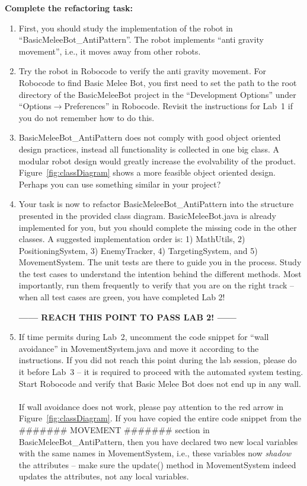 \documentclass{scrreprt}
\begin{document}
\newpage

\textbf{Complete the refactoring task:}
\begin{enumerate}
\item First, you should study the implementation of the robot in ``BasicMeleeBot_AntiPattern''. The robot implements ``anti gravity movement'', i.e., it moves away from other robots. 
\item Try the robot in Robocode to verify the anti gravity movement. For Robocode to find Basic Melee Bot, you first need to set the path to the root directory of the BasicMeleeBot project in the ``Development Options'' under ``Options$\rightarrow$Preferences'' in Robocode. Revisit the instructions for Lab~1 if you do not remember how to do this.
\item BasicMeleeBot_AntiPattern does not comply with good object oriented design practices, instead all functionality is collected in one big class. A modular robot design would greatly increase the evolvability of the product. Figure~\ref{fig:classDiagram} shows a more feasible object oriented design. Perhaps you can use something similar in your project?
\item Your task is now to refactor BasicMeleeBot_AntiPattern into the structure presented in the provided class diagram. BasicMeleeBot.java is already implemented for you, but you should complete the missing code in the other classes. A suggested implementation order is: 1) MathUtils, 2) PositioningSystem, 3) EnemyTracker, 4) TargetingSystem, and 5) MovementSystem. The unit tests are there to guide you in the process. Study the test cases to understand the intention behind the different methods. Most importantly, run them frequently to verify that you are on the right track -- when all test cases are green, you have completed Lab 2!

\begin{center}
\textbf{------ REACH THIS POINT TO PASS LAB 2! ------}
\end{center}

\item If time permits during Lab~2, uncomment the code snippet for ``wall avoidance'' in MovementSystem.java and move it according to the instructions. If you did not reach this point during the lab session, please do it before Lab~3 -- it is required to proceed with the automated system testing. Start Robocode and verify that Basic Melee Bot does not end up in any wall. \\\\If wall avoidance does not work, please pay attention to the red arrow in Figure~\ref{fig:classDiagram}. If you have copied the entire code snippet from the \#\#\#\#\#\#\# MOVEMENT \#\#\#\#\#\#\# section in BasicMeleeBot\_AntiPattern, then you have declared two new local variables with the same names in MovementSystem, i.e., these variables now \textit{shadow} the attributes -- make sure the update() method in MovementSystem indeed updates the attributes, not any local variables.
\end{enumerate}
\end{document}
